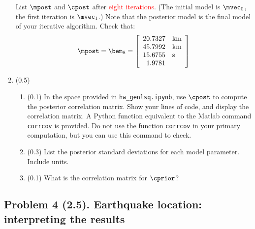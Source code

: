 \documentclass[11pt,titlepage,fleqn]{article}
\newcommand{\tfile}{{\tt hw\_genlsq.ipynb}}
\begin{document}
\begin{enumerate}
List $\mpost$ and $\cpost$ after \textcolor{red}{eight iterations}. (The initial model is $\mvec_0$, the first iteration is $\mvec_1$.) Note that the posterior model is the final model of your iterative algorithm. Check that:
%
\begin{eqnarray}
\mpost = \bem_{8} =
\left[
\begin{array}{rl}
20.7327 & {\rm km} \\
45.7992 & {\rm km} \\
15.6755 & {\rm s} \\
1.9781  &  \\
\end{array}
\right]
\end{eqnarray}


\item (0.5) 
\begin{enumerate}
\item (0.1) In the space provided in \tfile, use $\cpost$ to compute the posterior correlation matrix. Show your lines of code, and display the correlation matrix. A Python function equivalent to the Matlab command \verb+corrcov+ is provided. Do not use the function \verb+corrcov+ in your primary computation, but you can use this command to check.

\item (0.3) List the posterior standard deviations for each model parameter. Include units.

\item (0.1) What is the correlation matrix for $\cprior$?
\end{enumerate}

\end{enumerate}


\subsection*{Problem 4 (2.5). Earthquake location: interpreting the results}
\end{document}
